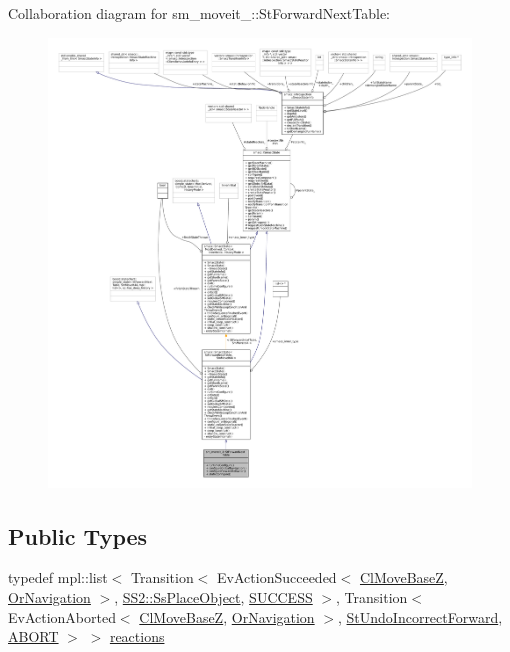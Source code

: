 Collaboration diagram for sm\+\_\+moveit\+\_\+:\+:St\+Forward\+Next\+Table\+:
\nopagebreak
\begin{figure}[H]
\begin{center}
\leavevmode
\includegraphics[width=350pt]{structsm__moveit__4_1_1StForwardNextTable__coll__graph}
\end{center}
\end{figure}
\subsection*{Public Types}
\begin{DoxyCompactItemize}
\item 
typedef mpl\+::list$<$ Transition$<$ Ev\+Action\+Succeeded$<$ \hyperlink{classcl__move__base__z_1_1ClMoveBaseZ}{Cl\+Move\+BaseZ}, \hyperlink{classsm__moveit__4_1_1OrNavigation}{Or\+Navigation} $>$, \hyperlink{structsm__moveit__4_1_1SS2_1_1SsPlaceObject}{S\+S2\+::\+Ss\+Place\+Object}, \hyperlink{classSUCCESS}{S\+U\+C\+C\+E\+SS} $>$, Transition$<$ Ev\+Action\+Aborted$<$ \hyperlink{classcl__move__base__z_1_1ClMoveBaseZ}{Cl\+Move\+BaseZ}, \hyperlink{classsm__moveit__4_1_1OrNavigation}{Or\+Navigation} $>$, \hyperlink{structsm__moveit__4_1_1StUndoIncorrectForward}{St\+Undo\+Incorrect\+Forward}, \hyperlink{classABORT}{A\+B\+O\+RT} $>$ $>$ \hyperlink{structsm__moveit__4_1_1StForwardNextTable_a156f5e9bc646dc95905cacb3370331f6}{reactions}
\end{DoxyCompactItemize}
